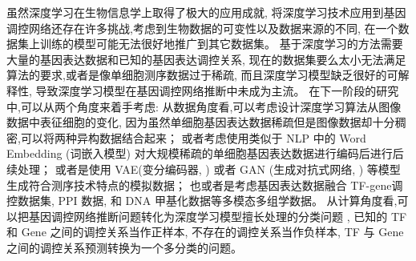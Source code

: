 虽然深度学习在生物信息学上取得了极大的应用成就,
将深度学习技术应用到基因调控网络还存在许多挑战,考虑到生物数据的可变性以及数据来源的不同,
在一个数据集上训练的模型可能无法很好地推广到其它数据集。
基于深度学习的方法需要大量的基因表达数据和已知的基因表达调控关系,
现在的数据集要么太小无法满足算法的要求,或者是像单细胞测序数据过于稀疏,
而且深度学习模型缺乏很好的可解释性,
导致深度学习模型在基因调控网络推断中未成为主流。
在下一阶段的研究中,可以从两个角度来着手考虑:
从数据角度看,可以考虑设计深度学习算法从图像数据中表征细胞的变化,
因为虽然单细胞基因表达数据稀疏但是图像数据却十分稠密,可以将两种异构数据结合起来；
或者考虑使用类似于 NLP 中的 Word Embedding (词嵌入模型) 对大规模稀疏的单细胞基因表达数据进行编码后进行后续处理；
或者是使用 VAE(变分编码器, ) 或者 GAN (生成对抗式网络, ) 等模型生成符合测序技术特点的模拟数据；
也或者是考虑基因表达数据融合 TF-gene调控数据集, PPI 数据, 和 DNA 甲基化数据等多模态多组学数据。
从计算角度看,可以把基因调控网络推断问题转化为深度学习模型擅长处理的分类问题 , 
已知的 TF 和 Gene 之间的调控关系当作正样本, 不存在的调控关系当作负样本,
TF 与 Gene 之间的调控关系预测转换为一个多分类的问题。